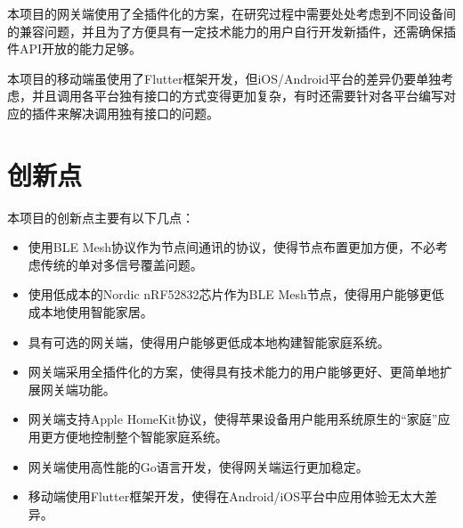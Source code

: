 本项目的网关端使用了全插件化的方案，在研究过程中需要处处考虑到不同设备间的兼容问题，并且为了方便具有一定技术能力的用户自行开发新插件，还需确保插件API开放的能力足够。

本项目的移动端虽使用了Flutter框架开发，但iOS/Android平台的差异仍要单独考虑，并且调用各平台独有接口的方式变得更加复杂，有时还需要针对各平台编写对应的插件来解决调用独有接口的问题。
\section{创新点}
本项目的创新点主要有以下几点：
\begin{itemize}
    \item 使用BLE Mesh协议作为节点间通讯的协议，使得节点布置更加方便，不必考虑传统的单对多信号覆盖问题。
    \item 使用低成本的Nordic nRF52832芯片作为BLE Mesh节点，使得用户能够更低成本地使用智能家居。
    \item 具有可选的网关端，使得用户能够更低成本地构建智能家庭系统。
    \item 网关端采用全插件化的方案，使得具有技术能力的用户能够更好、更简单地扩展网关端功能。
    \item 网关端支持Apple HomeKit协议，使得苹果设备用户能用系统原生的“家庭”应用更方便地控制整个智能家庭系统。
    \item 网关端使用高性能的Go语言开发，使得网关端运行更加稳定。
    \item 移动端使用Flutter框架开发，使得在Android/iOS平台中应用体验无太大差异。
\end{itemize}